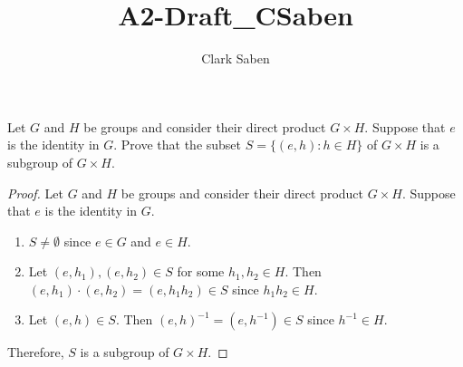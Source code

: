 \documentclass[12pt]{article}
\newenvironment{problem}[2][Problem]{\begin{trivlist}
\item[\hskip \labelsep {\bfseries #1}\hskip \labelsep {\bfseries #2.}]}{\end{trivlist}}
\begin{document}
 
 
\title{A2-Draft\_CSaben}
\author{Clark Saben}

 
\maketitle

\begin{problem}{1}
Let $G$ and $H$ be groups and consider their direct product $G \times H$. Suppose that $e$ is the identity in $G$. Prove that the subset $S=\{(e, h): h \in H\}$ of $G \times H$ is a subgroup of $G \times H$.

\begin{proof}
	Let $G$ and $H$ be groups and consider their direct product $G \times H$. Suppose that $e$ is the identity in $G$.
	\begin{enumerate}
		\item $S \neq \emptyset$ since $e \in G$ and $e \in H$.
		\item Let $(e, h_1), (e, h_2) \in S$ for some $h_1, h_2 \in H$. Then $(e, h_1)\cdot(e, h_2) = (e, h_1h_2) \in S$ since $h_1h_2 \in H$.
		\item Let $(e, h) \in S$. Then $(e, h)^{-1} = (e, h^{-1}) \in S$ since $h^{-1} \in H$.
	\end{enumerate}
	Therefore, $S$ is a subgroup of $G \times H$.
	
\end{proof}
\end{problem}
\end{document}
